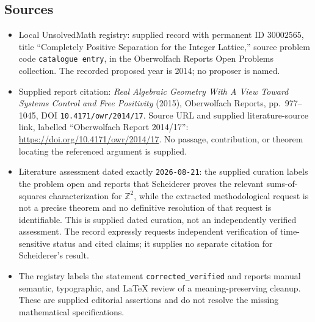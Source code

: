 \documentclass[11pt]{article}
\newcommand{\Z}{\mathbb{Z}}
\begin{document}
\subsection{Sources}
\begin{itemize}
\item Local UnsolvedMath registry: supplied record with permanent ID \(30002565\), title ``Completely Positive Separation for the Integer Lattice,'' source problem code \texttt{catalogue entry}, in the Oberwolfach Reports Open Problems collection. The recorded proposed year is 2014; no proposer is named.
\item Supplied report citation: \emph{Real Algebraic Geometry With A View Toward Systems Control and Free Positivity} (2015), Oberwolfach Reports, pp.~977--1045, DOI \texttt{10.4171/owr/2014/17}. Source URL and supplied literature-source link, labelled ``Oberwolfach Report 2014/17'': \url{https://doi.org/10.4171/owr/2014/17}. No passage, contribution, or theorem locating the referenced argument is supplied.
\item Literature assessment dated exactly \texttt{2026-08-21}: the supplied curation labels the problem open and reports that Scheiderer proves the relevant sums-of-squares characterization for \(\Z^2\), while the extracted methodological request is not a precise theorem and no definitive resolution of that request is identifiable. This is supplied dated curation, not an independently verified assessment. The record expressly requests independent verification of time-sensitive status and cited claims; it supplies no separate citation for Scheiderer's result.
\item The registry labels the statement \texttt{corrected\_verified} and reports manual semantic, typographic, and LaTeX review of a meaning-preserving cleanup. These are supplied editorial assertions and do not resolve the missing mathematical specifications.
\end{itemize}
\end{document}

